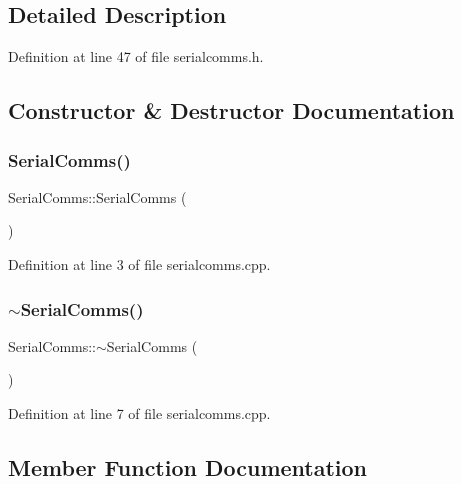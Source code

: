 \subsection{Detailed Description}


Definition at line 47 of file serialcomms.\+h.



\subsection{Constructor \& Destructor Documentation}
\mbox{\label{classSerialComms_a0a40e994d9726ef0df2e109942c24017}} 
\subsubsection{\texorpdfstring{SerialComms()}{SerialComms()}}
{\footnotesize\ttfamily Serial\+Comms\+::\+Serial\+Comms (\begin{DoxyParamCaption}{ }\end{DoxyParamCaption})}



Definition at line 3 of file serialcomms.\+cpp.

\mbox{\label{classSerialComms_a895edf0d156be20f30422969ee30b20f}} 
\subsubsection{\texorpdfstring{$\sim$SerialComms()}{~SerialComms()}}
{\footnotesize\ttfamily Serial\+Comms\+::$\sim$\+Serial\+Comms (\begin{DoxyParamCaption}{ }\end{DoxyParamCaption})}



Definition at line 7 of file serialcomms.\+cpp.



\subsection{Member Function Documentation}
\mbox{\label{classSerialComms_a4488e53e2a6693ad72759eff9862ac37}} 
